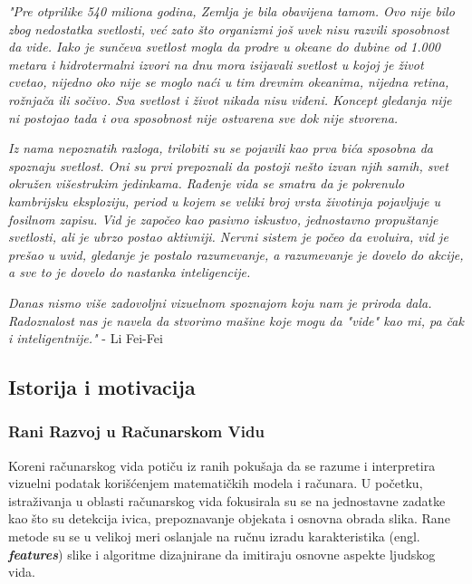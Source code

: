 \documentclass[12pt]{article}
\begin{document}
   \textit{"Pre otprilike 540 miliona godina, 
   Zemlja je bila obavijena tamom.
   Ovo nije bilo zbog nedostatka svetlosti,
   već zato što organizmi još uvek nisu razvili sposobnost da vide.
   Iako je sunčeva svetlost mogla da prodre u okeane do dubine
   od 1.000 metara i hidrotermalni izvori na dnu mora isijavali 
   svetlost u kojoj je život cvetao, nijedno oko nije se moglo naći 
   u tim drevnim okeanima, nijedna retina, rožnjača ili sočivo. 
   Sva svetlost i život nikada nisu viđeni. Koncept gledanja nije ni postojao tada 
   i ova sposobnost nije ostvarena sve dok nije stvorena.
   }
   
   \textit{Iz nama nepoznatih razloga, trilobiti su se pojavili kao prva bića sposobna
   da spoznaju svetlost. Oni su prvi prepoznali da postoji nešto izvan
   njih samih, svet okružen višestrukim jedinkama. Rađenje vida se smatra da je pokrenulo
   kambrijsku eksploziju, period u kojem se veliki broj vrsta životinja pojavljuje u 
   fosilnom zapisu. Vid je započeo kao pasivno iskustvo, jednostavno propuštanje svetlosti, 
   ali je ubrzo postao aktivniji. Nervni sistem je počeo da evoluira, vid je prešao u uvid, 
   gledanje je postalo razumevanje, a razumevanje je dovelo do akcije, a sve to je dovelo do 
   nastanka inteligencije.}
   
   \textit{Danas nismo više zadovoljni vizuelnom spoznajom koju nam je priroda dala. 
   Radoznalost nas je navela da stvorimo mašine koje mogu da "vide" kao mi, pa čak i inteligentnije."} - Li Fei-Fei \cite{li_fei_fei}
   

   \subsection{Istorija i motivacija}
   \vspace{-0.5cm}
   \subsubsection{Rani Razvoj u Računarskom Vidu}

   Koreni računarskog vida potiču iz ranih pokušaja da se razume 
   i interpretira vizuelni podatak korišćenjem matematičkih modela i računara. 
   U početku, istraživanja u oblasti računarskog vida fokusirala su se na 
   jednostavne zadatke kao što su detekcija ivica, prepoznavanje objekata i 
   osnovna obrada slika. Rane metode su se u velikoj meri oslanjale na ručnu 
   izradu karakteristika (engl. \textbf{\textit{features}}) slike i algoritme dizajnirane da imitiraju osnovne aspekte 
   ljudskog vida.
\end{document}
